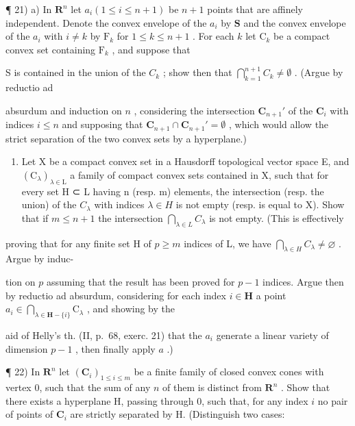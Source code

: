 ¶ 21) a) In \(\mathbf{R}^n\) let \(a_i (1 \leqslant i \leqslant n + 1)\) be \(n + 1\) points that are affinely independent. Denote the convex envelope of the \(a_i\) by \(\mathbf{S}\) and the convex envelope of the \(a_i\) with \(i \neq k\) by \(\mathrm{F}_k\) for \(1 \leqslant k \leqslant n + 1\) . For each \(k\) let \(\mathrm{C}_k\) be a compact convex set containing \(\mathrm{F}_k\) , and suppose that

S is contained in the union of the \(C_k\) ; show then that \(\bigcap_{k=1}^{n+1} C_k \neq \emptyset\) . (Argue by reductio ad

absurdum and induction on \(n\) , considering the intersection \(\mathbf{C}_{n+1}'\) of the \(\mathbf{C}_i\) with indices \(i \leqslant n\) and supposing that \(\mathbf{C}_{n+1} \cap \mathbf{C}_{n+1}' = \emptyset\) , which would allow the strict separation of the two convex sets by a hyperplane.)

\begin{enumerate}
\def\labelenumi{\alph{enumi})}
\setcounter{enumi}{1}
\tightlist
\item
  Let X be a compact convex set in a Hausdorff topological vector space E, and \((\mathrm{C}_{\lambda})_{\lambda\in\mathrm{L}}\) a family of compact convex sets contained in X, such that for every set H ⊂ L having n (resp. m) elements, the intersection (resp. the union) of the \(C_{\lambda}\) with indices \(\lambda\in H\) is not empty (resp. is equal to X). Show that if \(m\leqslant n+1\) the intersection \(\bigcap_{\lambda\in L}C_{\lambda}\) is not empty. (This is effectively
\end{enumerate}

proving that for any finite set H of \(p \geqslant m\) indices of L, we have \(\bigcap_{\lambda \in H} C_{\lambda} \neq \varnothing\) . Argue by induc-

tion on \(p\) assuming that the result has been proved for \(p - 1\) indices. Argue then by reductio ad absurdum, considering for each index \(i \in \mathbf{H}\) a point \(a_i \in \bigcap_{\lambda \in \mathbf{H} - \{i\}} \mathrm{C}_\lambda\) , and showing by the

aid of Helly's th. (II, p.~68, exerc. 21) that the \(a_{i}\) generate a linear variety of dimension \(p - 1\) , then finally apply \(a\) .)

¶ 22) In \(\mathbf{R}^n\) let \((\mathbf{C}_i)_{1 \leqslant i \leqslant m}\) be a finite family of closed convex cones with vertex 0, such that the sum of any \(n\) of them is distinct from \(\mathbf{R}^n\) . Show that there exists a hyperplane H, passing through 0, such that, for any index \(i\) no pair of points of \(\mathbf{C}_i\) are strictly separated by H. (Distinguish two cases:

